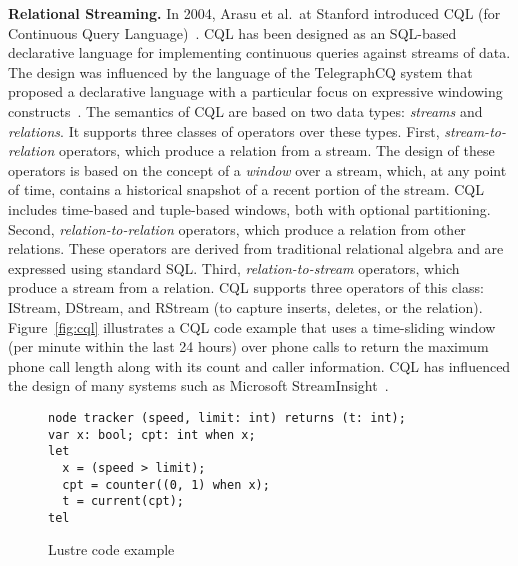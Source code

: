 \textbf{Relational Streaming.}
In 2004, Arasu et al.\ at Stanford introduced CQL (for Continuous
Query Language)~\cite{arasu_widom_2004}. CQL has been designed as an
SQL-based declarative language for implementing continuous queries
against streams of data. The design was influenced by the language of
the TelegraphCQ system that proposed a declarative language with a
particular focus on expressive windowing
constructs~\cite{chandrasekaran_et_al_2003}. The semantics of CQL are
based on two data types: \emph{streams} and \emph{relations}. It
supports three classes of operators over these types. First,
\emph{stream-to-relation} operators, which produce a relation from a
stream.  The design of these operators is based on the concept of a
\emph{window} over a stream, which, at any point of time, contains a
historical snapshot of a recent portion of the stream. CQL includes
time-based and tuple-based windows, both with optional
partitioning. Second, \emph{relation-to-relation} operators, which
produce a relation from other relations. These operators are derived
from traditional relational algebra and are expressed using standard
SQL. Third, \emph{relation-to-stream} operators, which produce a
stream from a relation. CQL supports three operators of this class:
IStream, DStream, and RStream (to capture inserts, deletes, or the
relation).  Figure~\ref{fig:cql} illustrates a CQL code example that
uses a time-sliding window (per minute within the last 24 hours) over
phone calls to return the maximum phone call length along with its
count and caller information. CQL has influenced the design of many
systems such as Microsoft StreamInsight~\cite{ali_et_al_2009}.


\begin{figure}[!h]
  \begin{lstlisting}
node tracker (speed, limit: int) returns (t: int);
var x: bool; cpt: int when x;
let
  x = (speed > limit);
  cpt = counter((0, 1) when x);
  t = current(cpt);
tel
  \end{lstlisting}
  \caption{\label{fig:lustre} Lustre code example}
\end{figure}

